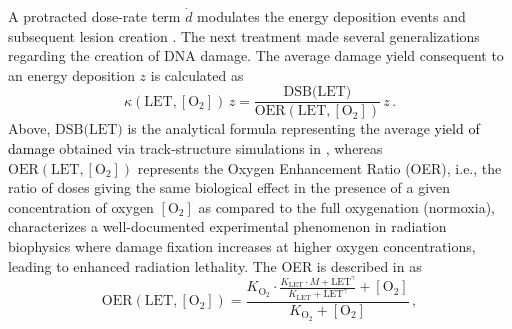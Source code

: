 \documentclass[10pt]{iopart}
\newcommand{\ema}[1]{\textcolor{black}{#1}}
\numberwithin{table}{section}
\begin{document}
A protracted dose-rate term $\dot{d}$ modulates the energy deposition events and subsequent lesion creation \cite{cordoni2021generalized}. The next treatment made several generalizations regarding the creation of DNA damage. The average damage yield consequent to an energy deposition $z$ is calculated as
\begin{equation}\label{EQN:kDNA}
\kappa\left( \mathrm{LET}, [\mathrm{O_2}] \right) \,z = \frac{\text{DSB($\mathrm{LET}$)}}{\mathrm{OER} \left( \mathrm{LET}, [\mathrm{O_2}] \right) } \,z\,.
\end{equation}
Above, $\text{DSB($\mathrm{LET}$)}$ is the analytical formula representing the average \ema{yield of damage} obtained via track‑structure simulations in \cite{kundrat2020analytical}, whereas $\mathrm{OER} \left( \mathrm{LET}, [\mathrm{O_2}] \right)$ represents the Oxygen Enhancement Ratio (OER), i.e., the ratio of doses giving the same biological effect in the presence of a given concentration of oxygen $[\mathrm{O_2}]$ as compared to the full oxygenation (normoxia), characterizes a well-documented experimental phenomenon in radiation biophysics where damage fixation increases at higher oxygen concentrations, leading to enhanced radiation lethality. The OER is described in \cite{Scifoni2013, Epp1972} as
\begin{equation}\label{EQN:OER}
\mathrm{OER} \left( \mathrm{LET}, [\mathrm{O_2}] \right) = \frac{K_{\mathrm{O_2}} \cdot  \frac{K_{\mathrm{LET}} \cdot M + \mathrm{LET}^\gamma}{K_{\mathrm{LET}} + \mathrm{LET}^\gamma} + [\mathrm{O_2}]}{K_{\mathrm{O_2}} + [\mathrm{O_2}]} \,,
\end{equation}
\end{document}
